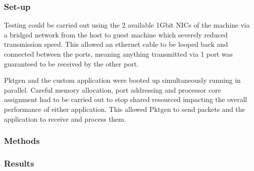\documentclass[final_report.tex]{subfiles}
\begin{document}
\subsubsection{Set-up}
Testing could be carried out using the 2 available 1Gbit NICs of the machine via a bridged network from the host to guest machine which severely reduced transmission speed. This allowed an ethernet cable to be looped back and connected between the ports, meaning anything transmitted via 1 port was guaranteed to be received by the other port.

Pktgen and the custom application were booted up simultaneously running in parallel. Careful memory allocation, port addressing and processor core assignment had to be carried out to stop shared resourced impacting the overall performance of either application. This allowed Pktgen to send packets and the application to receive and process them.

\subsubsection{Methods}

\subsubsection{Results}
\end{document}
